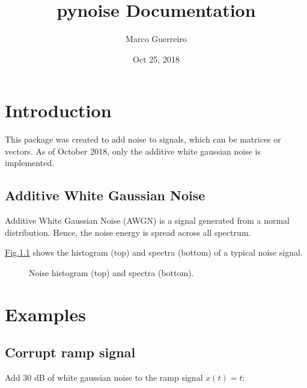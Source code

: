 \documentclass[letterpaper,10pt,english]{sphinxmanual}
\title{pynoise Documentation}
\date{Oct 25, 2018}
\author{Marco Guerreiro}
\begin{document}
\pagestyle{empty}
\maketitle
\pagestyle{plain}
\sphinxtableofcontents
\pagestyle{normal}
\label{\detokenize{index::doc}}



\chapter{Introduction}
\label{\detokenize{intro:introduction}}\label{\detokenize{intro::doc}}
This package was created to add noise to signals, which can be matrices or vectors. As of October 2018, only the additive white gaussian noise is implemented.


\section{Additive White Gaussian Noise}
\label{\detokenize{intro:additive-white-gaussian-noise}}
Additive White Gaussian Noise (AWGN) is a signal generated from a normal distribution. Hence, the noise energy is spread across all spectrum.

\hyperref[\detokenize{intro:fig-noise-spectra}]{Fig.\@ \ref{\detokenize{intro:fig-noise-spectra}}} shows the histogram (top) and spectra (bottom) of a typical noise signal.

\begin{figure}[htbp]
\centering
\capstart

\noindent{}
\caption{Noise histogram (top) and spectra (bottom).}\label{\detokenize{intro:id1}}\label{\detokenize{intro:fig-noise-spectra}}\end{figure}


\chapter{Examples}
\label{\detokenize{examples:examples}}\label{\detokenize{examples::doc}}

\section{Corrupt ramp signal}
\label{\detokenize{examples:corrupt-ramp-signal}}
Add 30 dB of white gaussian noise to the ramp signal \(x(t) = t\):
\end{document}
